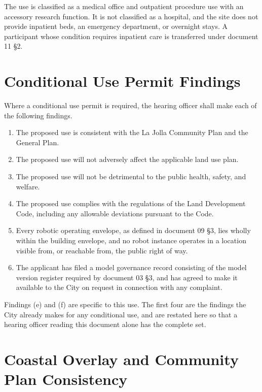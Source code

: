 The use is classified as a medical office and outpatient procedure use with an
accessory research function. It is not classified as a hospital, and the site
does not provide inpatient beds, an emergency department, or overnight stays. A
participant whose condition requires inpatient care is transferred under
document 11 §2.

\section{Conditional Use Permit Findings}

Where a conditional use permit is required, the hearing officer shall make each
of the following findings.

\begin{enumerate}
\item The proposed use is consistent with the La Jolla Community Plan and the
  General Plan.

\item The proposed use will not adversely affect the applicable land use plan.

\item The proposed use will not be detrimental to the public health, safety, and
  welfare.

\item The proposed use complies with the regulations of the Land Development
  Code, including any allowable deviations pursuant to the Code.

\item Every robotic operating envelope, as defined in document 09 §3, lies
  wholly within the building envelope, and no robot instance operates in a
  location visible from, or reachable from, the public right of way.

\item The applicant has filed a model governance record consisting of the model
  version register required by document 03 §3, and has agreed to make it
  available to the City on request in connection with any complaint.
\end{enumerate}

Findings (e) and (f) are specific to this use. The first four are the findings
the City already makes for any conditional use, and are restated here so that a
hearing officer reading this document alone has the complete set.

\section{Coastal Overlay and Community Plan Consistency}

